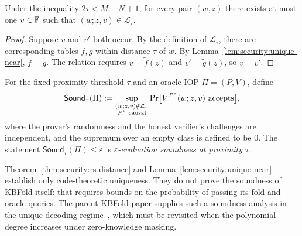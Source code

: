 \begin{corollary}\label{cor:security:unique-value}
Under the inequality $2\tau<M-N+1$, for every pair $(w,z)$ there exists at most one $v\in\mathbb{F}$ such that $(w;z,v)\in\mathcal L_\tau$.
\end{corollary}
\begin{proof}
Suppose $v$ and $v'$ both occur. By the definition of $\mathcal L_\tau$, there are corresponding tables $f,g$ within distance $\tau$ of $w$. By Lemma~\ref{lem:security:unique-near}, $f=g$. The relation requires $v=\widetilde f(z)$ and $v'=\widetilde g(z)$, so $v=v'$.
\end{proof}

\begin{definition}\label{def:security:eval-sound}
For the fixed proximity threshold $\tau$ and an oracle IOP $\Pi=(P,V)$, define
\[
 \mathsf{Sound}_\tau(\Pi)
 :=\sup_{\substack{(w;z,v)\notin\mathcal L_\tau\\P^*\ {\rm causal}}}
  \Pr\bigl[V^{P^*}(w;z,v)\text{ accepts}\bigr],
\]
where the prover's randomness and the honest verifier's challenges are independent, and the supremum over an empty class is defined to be $0$. The statement $\mathsf{Sound}_\tau(\Pi)\leq\varepsilon$ is \emph{$\varepsilon$-evaluation soundness at proximity $\tau$}.
\end{definition}

\begin{remark}
Theorem~\ref{thm:security:rs-distance} and Lemma~\ref{lem:security:unique-near} establish only code-theoretic uniqueness. They do not prove the soundness of KBFold itself: that requires bounds on the probability of passing its fold and oracle queries. The parent KBFold paper supplies such a soundness analysis in the unique-decoding regime~\cite{MkhidaKBFold2026}, which must be revisited when the polynomial degree increases under zero-knowledge masking.
\end{remark}
